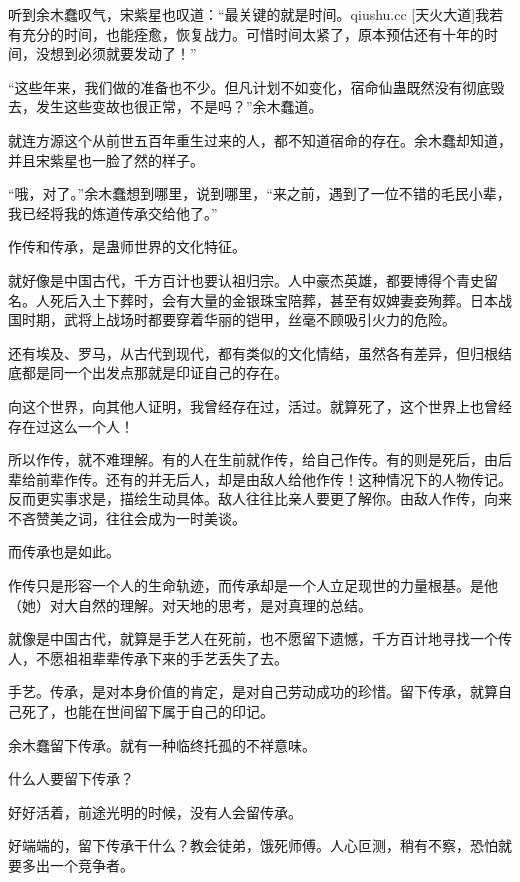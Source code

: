 
\begin{this_body}

听到余木蠢叹气，宋紫星也叹道：“最关键的就是时间。qiushu.cc [天火大道]我若有充分的时间，也能痊愈，恢复战力。可惜时间太紧了，原本预估还有十年的时间，没想到必须就要发动了！”

“这些年来，我们做的准备也不少。但凡计划不如变化，宿命仙蛊既然没有彻底毁去，发生这些变故也很正常，不是吗？”余木蠢道。

就连方源这个从前世五百年重生过来的人，都不知道宿命的存在。余木蠢却知道，并且宋紫星也一脸了然的样子。

“哦，对了。”余木蠢想到哪里，说到哪里，“来之前，遇到了一位不错的毛民小辈，我已经将我的炼道传承交给他了。”

作传和传承，是蛊师世界的文化特征。

就好像是中国古代，千方百计也要认祖归宗。人中豪杰英雄，都要博得个青史留名。人死后入土下葬时，会有大量的金银珠宝陪葬，甚至有奴婢妻妾殉葬。日本战国时期，武将上战场时都要穿着华丽的铠甲，丝毫不顾吸引火力的危险。

还有埃及、罗马，从古代到现代，都有类似的文化情结，虽然各有差异，但归根结底都是同一个出发点那就是印证自己的存在。

向这个世界，向其他人证明，我曾经存在过，活过。就算死了，这个世界上也曾经存在过这么一个人！

所以作传，就不难理解。有的人在生前就作传，给自己作传。有的则是死后，由后辈给前辈作传。还有的并无后人，却是由敌人给他作传！这种情况下的人物传记。反而更实事求是，描绘生动具体。敌人往往比亲人要更了解你。由敌人作传，向来不吝赞美之词，往往会成为一时美谈。

而传承也是如此。

作传只是形容一个人的生命轨迹，而传承却是一个人立足现世的力量根基。是他（她）对大自然的理解。对天地的思考，是对真理的总结。

就像是中国古代，就算是手艺人在死前，也不愿留下遗憾，千方百计地寻找一个传人，不愿祖祖辈辈传承下来的手艺丢失了去。

手艺。传承，是对本身价值的肯定，是对自己劳动成功的珍惜。留下传承，就算自己死了，也能在世间留下属于自己的印记。

余木蠢留下传承。就有一种临终托孤的不祥意味。

什么人要留下传承？

好好活着，前途光明的时候，没有人会留传承。

好端端的，留下传承干什么？教会徒弟，饿死师傅。人心叵测，稍有不察，恐怕就要多出一个竞争者。


\end{this_body}
